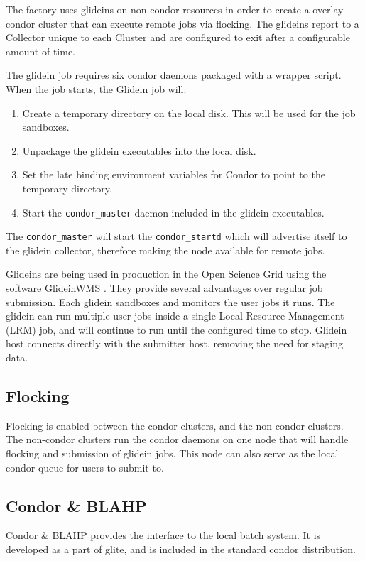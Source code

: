 \documentclass[11pt]{article}
\begin{document}
The factory uses glideins on non-condor resources in order to create a overlay condor cluster that can execute remote jobs via flocking.  The glideins report to a Collector unique to each Cluster and are configured to exit after a configurable amount of time. 

The glidein job requires six condor daemons packaged with a wrapper script.  When the job starts, the Glidein job will:

\begin{enumerate}
\item Create a temporary directory on the local disk.  This will be used for the job sandboxes.
\item Unpackage the glidein executables into the local disk.
\item Set the late binding environment variables for Condor to point to the temporary directory.
\item Start the  \texttt{condor\_master} daemon included in the glidein executables.
\end{enumerate}

The \texttt{condor\_master} will start the \texttt{condor\_startd} which will advertise itself to the glidein collector, therefore making the node available for remote jobs.  

Glideins are being used in production in the Open Science Grid using the software GlideinWMS \cite{sfiligoi2008glideinwms}.  They provide several advantages over regular job submission.  Each glidein sandboxes and monitors the user jobs it runs.  The glidein can run multiple user jobs inside a single Local Resource Management (LRM) job, and will continue to run until the configured time to stop.  Glidein host connects directly with the submitter host, removing the need for staging data.

\subsection{Flocking}
Flocking is enabled between the condor clusters, and the non-condor clusters.  The non-condor clusters run the condor daemons on one node that will handle flocking and submission of glidein jobs.  This node can also serve as the local condor queue for users to submit to. 

\subsection{Condor \& BLAHP}
\label{sec:condorandblahp}
Condor \& BLAHP provides the interface to the local batch system.  It is developed as a part of glite, and is included in the standard condor distribution. 
\end{document}

